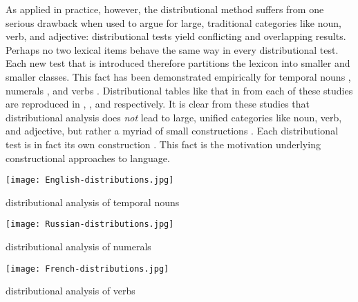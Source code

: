 As applied in practice, however, the distributional method suffers from one serious drawback when used to argue for large, traditional categories like noun, verb, and adjective: distributional tests yield conflicting and overlapping results. Perhaps no two lexical items behave the same way in every distributional test. Each new test that is introduced therefore partitions the lexicon into smaller and smaller classes. This fact has been demonstrated empirically for  temporal nouns \parencite[54]{Crystal1967},  numerals \parencite{Corbett1978}, and  verbs \parencite{Gross1979}. Distributional tables like that in  from each of these studies are reproduced in , , and  respectively. It is clear from these studies that distributional analysis does \emph{not} lead to large, unified categories like noun, verb, and adjective, but rather a myriad of small constructions \parencites[27]{Crystal1967}[434]{Croft2005}. Each distributional test is in fact its own construction \parencite[436]{Croft2005}. This fact is the motivation underlying constructional approaches to language.

\begin{table}[h!]
  \texttt{[image: English-distributions.jpg]}
  \caption[distributional analysis of English temporal nouns]{distributional analysis of  temporal nouns \parencite[54]{Crystal1967}}
  \label{tab:English-distributions-b}
\end{table}

\begin{table}[h!]
  \texttt{[image: Russian-distributions.jpg]}
  \caption[distributional analysis of Russian numerals]{distributional analysis of  numerals \parencite[359]{Corbett1978}}
  \label{tab:Russian-distributions}
\end{table}

\begin{table}[h!]
  \texttt{[image: French-distributions.jpg]}
  \caption[distributional analysis of French verbs]{distributional analysis of  verbs \parencite[860]{Gross1979}}
  \label{tab:French-distributions}
\end{table}

